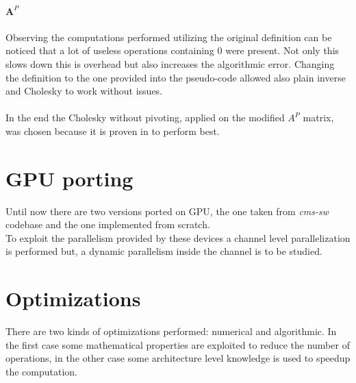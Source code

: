 \paragraph{$\boldsymbol A^P$} Observing the computations performed utilizing the original definition can be noticed that a lot of useless operations containing $0$ were present. Not only this slows down this is overhead but also increases the algorithmic error. Changing the definition to the one provided into the pseudo-code allowed also plain inverse and Cholesky to work without issues.
\paragraph*{}
In the end the Cholesky without pivoting, applied on the modified $A^P$ matrix, was chosen because it is proven in \cite{Lee_numericallyefficient} to perform best.\\

\section{GPU porting}
Until now there are two versions ported on GPU, the one taken from \textit{cms-sw} codebase and the one implemented from scratch.\\
To exploit the parallelism provided by these devices a channel level parallelization is performed but, a dynamic parallelism inside the channel is to be studied.%

\section{Optimizations}
There are two kinds of optimizations performed: numerical and algorithmic. In the first case some mathematical properties are exploited to reduce the number of operations, in the other case some architecture level knowledge is used to speedup the computation.
